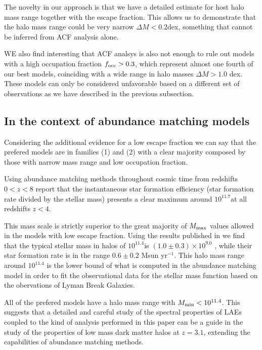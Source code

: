 \documentclass[usenatbib]{mn2e}
\newcommand{\hMsun}{{\ifmmode{h^{-1}{\rm
        {M_{\odot}}}}\else{$h^{-1}{\rm{M_{\odot}}}$}\fi}}
\newcommand{\Msun}{{\ifmmode{{\rm {M_{\odot}}}}\else{${\rm{M_{\odot}}}$}\fi}}
\begin{document}
The novelty in our approach is that we have a detailed estimate for 
host halo mass range together with the escape fraction. This allows us
to demonstrate that the halo mass range could be very narrow $\Delta M <
0.2$dex, something that cannot be inferred from ACF analysis
alone. 

WE also find interesting that ACF analsys is also not enough to rule
out models with a high occupation fraction $f_{\rm occ}>0.3$, which
represent almost one fourth of our best models, coinciding with a wide
range in halo masses $\Delta M>1.0$ dex. These models can only be
considered unfavorable based on a different set of observations as we
have described in the previous subsection.


\subsection{In the context of abundance matching models}


Considering the additional evidence for a low escape fraction we can
say that the prefered models are in families (1) and (2) with a
clear majority composed by those with narrow mass range and low occupation
fraction.  

Using abundance matching methods throughout cosmic time from redshifts
$0<z<8$ \cite{Behroozi2013a,Behroozi2013b} report that the instantaneous star
formation efficiency (star formation rate divided by the stellar mass)
presents a clear maximum around $10^{11.7}$\Msun at all redshifts
$z<4$.

This mass scale is strictly superior to the great majority of  $M_{\rm max}$
values allowed in the models with low escape fraction. Using the results published
in \cite{Behroozi2013a} we find that the typical stellar mass in halos
of $10^{11.4}$\hMsun is $(1.0\pm0.3)\times 10^{9.0}$ \hMsun, while
their star formation rate is in the range $0.6\pm 0.2$ Msun yr$^{-1}$.
This halo mass range around $10^{11.4}$ \hMsun is the lower bound of
what is computed in the abundance matching model in order to fit the
observational data for the stellar mass function based on the
obervations of Lyman Break Galaxies. 

All of the prefered models have a halo mass range with $M_{\rm
  min}<10^{11.4}$\hMsun. This suggests that a detailed and careful
study of the spectral properties of LAEs coupled to the kind of
analysis performed in this paper can be a guide in the study of the
properties of low mass dark matter halos at $z=3.1$, extending the
capabilities of abundance matching methods.
\end{document}
